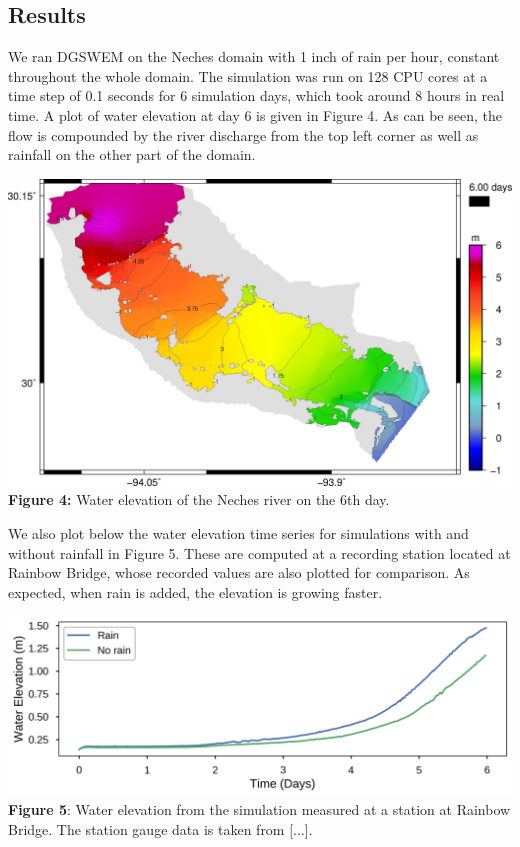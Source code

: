\documentclass[american]{article}
\begin{document}
\begin{multicols}{3}
\section*{Results}
\noindent We ran DGSWEM on the Neches domain with 1 inch of rain per hour, constant throughout the whole domain. The simulation was run on 128 CPU cores at a time step of 0.1 seconds for 6 simulation days, which took around 8 hours in real time. A plot of water elevation at day 6 is given in Figure 4. As can be seen, the flow is compounded by the river discharge from the top left corner as well as rainfall on the other part of the domain.
\begin{center}
    \vspace{0.5cm}
    \includegraphics[width=0.95 \linewidth]{media/rain.jpg}
    \textbf{Figure 4:} Water elevation of the Neches river on the 6th day.
\end{center}
We also plot below the water elevation time series for simulations with and without rainfall in Figure 5. These are computed at a recording station located at Rainbow Bridge, whose recorded values are also plotted for comparison. As expected, when rain is added, the elevation is growing faster.
\begin{center}
    \vspace{0.5cm}
    \includegraphics[width=0.95 \linewidth]{media/rainbow_bridge.png}
    \textbf{Figure 5}: Water elevation from the simulation measured at a station at Rainbow Bridge. The station gauge data is taken from [...].
\end{center}

\end{multicols}
\end{document}
